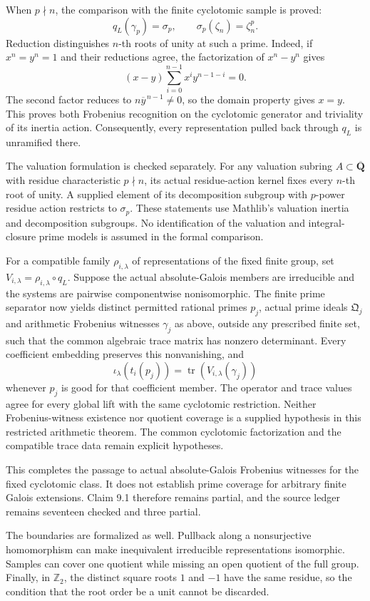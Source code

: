 \documentclass[11pt]{article}
\theoremstyle{definition}
\theoremstyle{remark}
\newcommand{\Q}{\mathbf Q}
\begin{document}
When $p\nmid n$, the comparison with the finite cyclotomic sample is proved:
\[
 q_L(\gamma_p)=\sigma_p,
 \qquad \sigma_p(\zeta_n)=\zeta_n^p.
\]
Reduction distinguishes $n$-th roots of unity at such a prime. Indeed, if
$x^n=y^n=1$ and their reductions agree, the factorization of $x^n-y^n$ gives
\[
 (x-y)\sum_{i=0}^{n-1}x^i y^{n-1-i}=0.
\]
The second factor reduces to $n\overline y^{\,n-1}\ne0$, so the domain
property gives $x=y$. This proves both Frobenius recognition on the
cyclotomic generator and triviality of its inertia action. Consequently,
every representation pulled back through $q_L$ is unramified there.

The valuation formulation is checked separately. For any valuation subring
$A\subset\overline{\Q}$ with residue characteristic $p\nmid n$, its actual
residue-action kernel fixes every $n$-th root of unity. A supplied element of
its decomposition subgroup with $p$-power residue action restricts to
$\sigma_p$. These statements use Mathlib's valuation inertia and decomposition
subgroups. No identification of the valuation and integral-closure prime
models is assumed in the formal comparison.

For a compatible family $\rho_{i,\lambda}$ of representations of the fixed
finite group, set $V_{i,\lambda}=\rho_{i,\lambda}\circ q_L$. Suppose the
actual absolute-Galois members are irreducible and the systems are pairwise
componentwise nonisomorphic. The finite prime separator now yields distinct
permitted rational primes $p_j$, actual prime ideals $\mathfrak Q_j$ and
arithmetic Frobenius witnesses $\gamma_j$ as above, outside any prescribed
finite set, such that the common algebraic trace matrix has nonzero
determinant. Every coefficient embedding preserves this nonvanishing, and
\[
 \iota_\lambda(t_i(p_j))=
 \operatorname{tr}(V_{i,\lambda}(\gamma_j))
\]
whenever $p_j$ is good for that coefficient member. The operator and trace
values agree for every global lift with the same cyclotomic restriction.
Neither Frobenius-witness existence nor quotient coverage is a supplied
hypothesis in this restricted arithmetic theorem. The common cyclotomic
factorization and the compatible trace data remain explicit hypotheses.

This completes the passage to actual absolute-Galois Frobenius witnesses for
the fixed cyclotomic class. It does not establish prime coverage for arbitrary
finite Galois extensions. Claim 9.1 therefore remains partial, and the
source ledger remains seventeen checked and three partial.

The boundaries are formalized as well. Pullback along a nonsurjective
homomorphism can make inequivalent irreducible representations isomorphic.
Samples can cover one quotient while missing an open quotient of the full
group. Finally, in $\mathbb Z_2$, the distinct square roots $1$ and $-1$ have
the same residue, so the condition that the root order be a unit cannot be
discarded.
\end{document}
